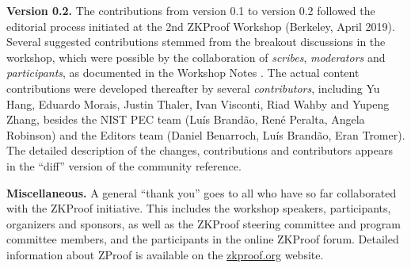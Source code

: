 \textbf{Version 0.2.}
	The contributions from version 0.1 to version 0.2 followed the editorial process initiated at the 2nd ZKProof Workshop (Berkeley, April 2019).
	Several suggested contributions stemmed from the breakout discussions in the workshop, which were possible by the collaboration of \emph{scribes}, \emph{moderators} and \emph{participants}, as documented in the Workshop Notes \cite{2019:zkproof:notes-2nd-workshop}.
	The actual content contributions were developed thereafter by several \emph{contributors}, including Yu Hang, Eduardo Morais, Justin Thaler, Ivan Visconti, Riad Wahby and Yupeng Zhang,
besides the NIST PEC team (Luís Brandão, René Peralta, Angela Robinson) 
and the Editors team (Daniel Benarroch, Luís Brandão, Eran Tromer).
	The detailed description of the changes, contributions and contributors appears in the ``diff'' version of the community reference.


\textbf{Miscellaneous.}
	A general ``thank you'' goes to all who have so far collaborated with the ZKProof initiative.
	This includes the workshop speakers, participants, organizers and sponsors, as well as the ZKProof steering committee and program committee members, and the participants in the online ZKProof forum.
	Detailed information about ZProof is available on the \href{https://zkproof.org/}{zkproof.org} website.
